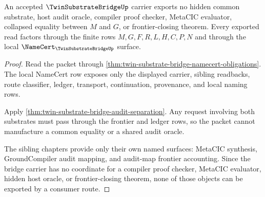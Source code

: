 \begin{theorem}
\label{thm:twin-substrate-bridge-nonescape}
An accepted $\TwinSubstrateBridgeUp$ carrier exports no hidden common substrate, host audit oracle, compiler proof checker, MetaCIC evaluator, collapsed equality between $M$ and $G$, or frontier-closing theorem. Every exported read factors through the finite rows $M,G,F,R,L,H,C,P,N$ and through the local $\NameCert_{\TwinSubstrateBridgeUp}$ surface.
\end{theorem}
\begin{proof}
Read the packet through \autoref{thm:twin-substrate-bridge-namecert-obligations}. The local NameCert row exposes only the displayed carrier, sibling readbacks, route classifier, ledger, transport, continuation, provenance, and local naming rows.

Apply \autoref{thm:twin-substrate-bridge-audit-separation}. Any request involving both substrates must pass through the frontier and ledger rows, so the packet cannot manufacture a common equality or a shared audit oracle.

The sibling chapters provide only their own named surfaces: MetaCIC synthesis, GroundCompiler audit mapping, and audit-map frontier accounting. Since the bridge carrier has no coordinate for a compiler proof checker, MetaCIC evaluator, hidden host oracle, or frontier-closing theorem, none of those objects can be exported by a consumer route.
\end{proof}


\begin{closurestatus}{\TwinSubstrateBridgeUp}
  \theoryclosure{\seedClosure}
  \formalstatus{\unformalizedV}
\end{closurestatus}
